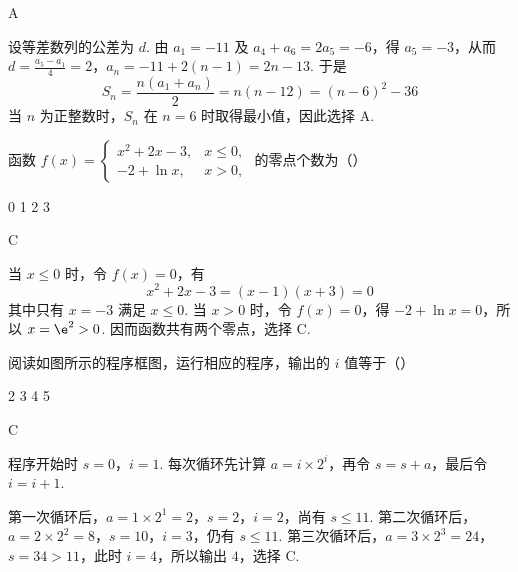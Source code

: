 \begin{answer}
A
\end{answer}

\begin{solution}
设等差数列的公差为 \(d\). 由 \(a_{1}=-11\) 及 \(a_{4}+a_{6}=2a_{5}=-6\)，得 \(a_{5}=-3\)，从而
\(d=\frac{a_{5}-a_{1}}{4}=2\)，\(a_{n}=-11+2(n-1)=2n-13\).
于是
\[
S_{n}=\frac{n(a_{1}+a_{n})}{2}=n(n-12)=\left(n-6\right)^{2}-36
\]
当 \(n\) 为正整数时，\(S_{n}\) 在 \(n=6\) 时取得最小值，因此选择 A.
\end{solution}

\begin{problem}
函数 \( f(x) = \begin{cases}
x^2 + 2x - 3, & x \leqslant 0,\\
-2 + \ln x, & x > 0,
\end{cases} \) 的零点个数为（\quad）

\choices
    {0}
    {1}
    {2}
    {3}
\end{problem}

\begin{answer}
C
\end{answer}

\begin{solution}
当 \(x\leqslant0\) 时，令 \(f(x)=0\)，有
\[
x^{2}+2x-3=(x-1)(x+3)=0
\]
其中只有 \(x=-3\) 满足 \(x\leqslant0\). 当 \(x>0\) 时，令 \(f(x)=0\)，得 \(-2+\ln x=0\)，所以 \(x=\e^{2}>0\). 因而函数共有两个零点，选择 C.
\end{solution}

\begin{problem}
阅读如图所示的程序框图，运行相应的程序，输出的 \(i\) 值等于（\quad）


\choices
    {2}
    {3}
    {4}
    {5}
\end{problem}

\begin{answer}
C
\end{answer}

\begin{solution}
程序开始时 \(s=0\)，\(i=1\). 每次循环先计算 \(a=i\times2^{i}\)，再令 \(s=s+a\)，最后令 \(i=i+1\).

第一次循环后，\(a=1\times2^{1}=2\)，\(s=2\)，\(i=2\)，尚有 \(s\leqslant11\). 第二次循环后，\(a=2\times2^{2}=8\)，\(s=10\)，\(i=3\)，仍有 \(s\leqslant11\). 第三次循环后，\(a=3\times2^{3}=24\)，\(s=34>11\)，此时 \(i=4\)，所以输出 \(4\)，选择 C.
\end{solution}

